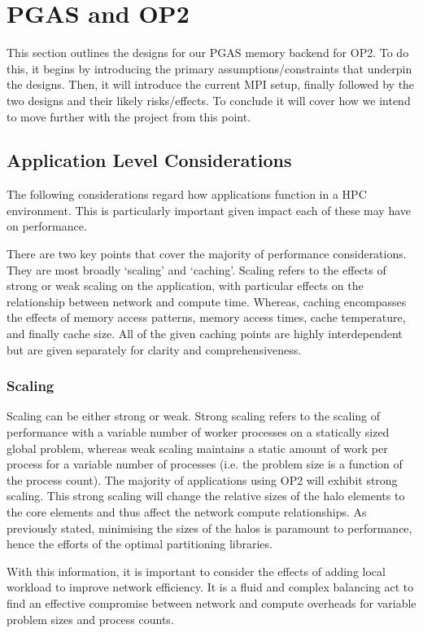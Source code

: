 \section{PGAS and OP2}

This section outlines the designs for our PGAS memory backend for OP2. To do this, it begins by introducing the primary assumptions/constraints that underpin the designs. Then, it will introduce the current MPI setup, finally followed by the two designs
and their likely risks/effects. To conclude it will cover how we intend to move further with the project from this point.

\subsection{Application Level Considerations}
The following considerations regard how applications function in a HPC environment. This is particularly important given impact each of these may have on performance. 

There are two key points that cover the majority of performance considerations. They are most broadly `scaling' and `caching'. Scaling refers to the effects of strong or weak scaling on the application, with particular effects on the relationship between network and compute time. Whereas, caching encompasses the effects of memory access patterns, memory access times, cache temperature, and finally cache size. All of the given caching points are highly interdependent but are given separately for clarity and comprehensiveness.

\subsubsection{Scaling}
Scaling can be either strong or weak. Strong scaling refers to the scaling of performance with a variable number of worker processes on a statically sized global problem, whereas weak scaling maintains a static amount of work per process for a variable number of processes (i.e. the problem size is a function of the process count). The majority of applications using OP2 will exhibit strong scaling. This strong scaling will change the relative sizes of the halo elements to the core elements and thus affect the network compute relationships. As previously stated, minimising the sizes of the halos is paramount to performance, hence the efforts of the optimal partitioning libraries. 

With this information, it is important to consider the effects of adding local workload to improve network efficiency. It is a fluid and complex balancing act to find an effective compromise between network and compute overheads for variable problem sizes and process counts.

